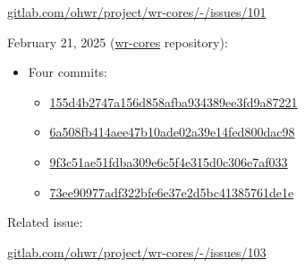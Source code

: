\href{https://gitlab.com/ohwr/project/wr-cores/-/issues/101}{gitlab.com/ohwr/project/wr-cores/-/issues/101}

\vspace{5mm}

\noindent February 21, 2025 (\href{https://gitlab.com/ohwr/project/wr-cores/}{wr-cores} repository):

\begin{itemize}
\item Four commits:
    \begin{itemize}
    \item \href{https://gitlab.com/ohwr/project/wr-cores/-/commit/155d4b2747a156d858afba934389ee3fd9a87221}{155d4b2747a156d858afba934389ee3fd9a87221}
    \item \href{https://gitlab.com/ohwr/project/wr-cores/-/commit/6a508fb414aee47b10ade02a39e14fed800dac98}{6a508fb414aee47b10ade02a39e14fed800dac98}
    \item \href{https://gitlab.com/ohwr/project/wr-cores/-/commit/9f3c51ae51fdba309e6c5f4e315d0c306e7af033}{9f3c51ae51fdba309e6c5f4e315d0c306e7af033}
    \item \href{https://gitlab.com/ohwr/project/wr-cores/-/commit/73ee90977adf322bfe6e37e2d5bc41385761de1e}{73ee90977adf322bfe6e37e2d5bc41385761de1e}
    \end{itemize}
\end{itemize}

\noindent Related issue:

\vspace{5mm}

\href{https://gitlab.com/ohwr/project/wr-cores/-/issues/103}{gitlab.com/ohwr/project/wr-cores/-/issues/103}

